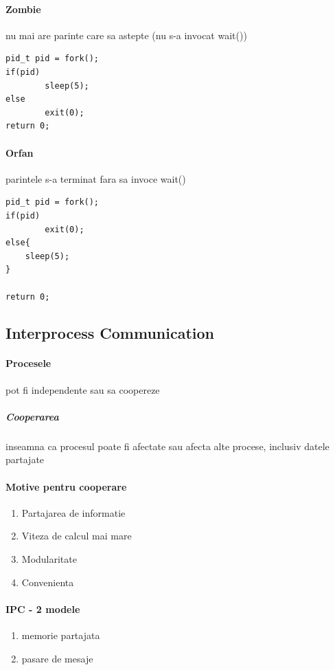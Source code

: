 \documentclass{article}
\begin{document}
\paragraph*{Zombie} nu mai are parinte care sa astepte (nu s-a invocat wait())
\begin{center}
    \begin{lstlisting}
pid_t pid = fork();
if(pid)
        sleep(5);
else
        exit(0);
return 0;
    \end{lstlisting}
\end{center}
\paragraph*{Orfan} parintele s-a terminat fara sa invoce wait()

\begin{center}
    \begin{lstlisting}
pid_t pid = fork();
if(pid)
        exit(0);
else{
    sleep(5);
}

return 0;
    \end{lstlisting}
\end{center}

\subsection*{Interprocess Communication}
\paragraph*{Procesele} pot fi independente sau sa coopereze
\subparagraph*{Cooperarea} inseamna ca procesul poate fi afectate sau afecta alte procese, inclusiv datele partajate
\paragraph*{Motive pentru cooperare}
\begin{enumerate}
    \item Partajarea de informatie
    \item Viteza de calcul mai mare
    \item Modularitate
    \item Convenienta
\end{enumerate}
\paragraph*{IPC - 2 modele}
\begin{enumerate}
    \item memorie partajata
    \item pasare de mesaje
\end{enumerate}
\end{document}

